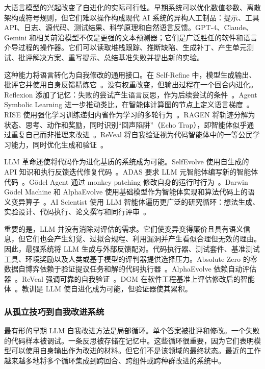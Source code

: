 大语言模型的兴起改变了自进化的实际可行性。早期系统可以优化数值参数、离散架构或符号规则，但它们难以操作构成现代 AI 系统的异构人工制品：提示、工具 API、日志、源代码、测试结果、科学原理和自然语言反馈。GPT-4、Claude、Gemini 和相关前沿模型不仅是更强的文本预测器；它们是广泛胜任的软件和语言介导过程的操作器。它们可以读取堆栈跟踪、推断缺陷、生成补丁、产生单元测试、批评解决方案、重写提示、总结基准失败并提出新的实验。

这种能力将语言转化为自我修改的通用接口。在 Self-Refine 中，模型生成输出、批评它并使用自身反馈精炼它~\citep{selfrefine2023}。没有权重改变，但输出过程在一个回合内进化。Reflexion 添加了记忆：失败的尝试产生语言反思，作为后续尝试的条件~\citep{reflexion2023}。Agent Symbolic Learning 进一步推动类比，在智能体计算图的节点上定义语言梯度~\citep{agentsymboliclearning2024}。RISE 使用强化学习训练递归内省作为学习的多轮行为~\citep{rise2024}。RAGEN 将轨迹分解为状态、思考、动作和奖励，同时识别``回声陷阱''（Echo Trap），即智能体似乎通过重复自己而非推理来改进~\citep{ragen2025}。ReVeal 将自我验证视为代码智能体中的一等公民学习能力，同时优化生成和验证~\citep{reveal2025}。

LLM 革命还使将代码作为进化基质的系统成为可能。SelfEvolve 使用自生成的 API 知识和执行反馈迭代修复代码~\citep{selfevolve2023}。ADAS 要求 LLM 元智能体编写新的智能体代码~\citep{adas2025}。G\"{o}del Agent 通过 monkey patching 修改自身的运行时行为~\citep{godelagent2024}。Darwin G\"{o}del Machine 和 AlphaEvolve 使用基础模型作为智能体实现和算法代码上的语义变异算子~\citep{darwingodelmachine2025,alphaevolve2025}。AI Scientist 使用 LLM 智能体遍历更广泛的研究循环：想法生成、实验设计、代码执行、论文撰写和同行评审~\citep{aiscientist2024}。

重要的是，LLM 并没有消除对评估的需求。它们使变异变得廉价且具有语义信息，但它们也会产生幻觉、过拟合规程、利用漏洞并产生看似合理但无效的理由。因此，最强系统将 LLM 生成与外部反馈配对。代码执行器、测试套件、基准测试工具、环境奖励以及人类或基于模型的评判器提供选择压力。Absolute Zero 的零数据自博弈依赖于验证提议任务和解的代码执行器~\citep{absolutezero2025}。AlphaEvolve 依赖自动评估器~\citep{alphaevolve2025}。ReVeal 强调可靠的自我验证~\citep{reveal2025}。DGM 在软件工程基准上评估修改后的智能体~\citep{darwingodelmachine2025}。教训是 LLM 使自进化成为可能，但验证器使其累积。

\subsubsection{从孤立技巧到自我改进系统}

最有形的早期 LLM 自我改进方法是局部循环。单个答案被批评和修改。一个失败的代码样本被调试。一条反思被存储在记忆中。这些循环很重要，因为它们表明模型可以使用自身输出作为改进的材料。但它们不是该领域的最终状态。最近的工作越来越多地将多个循环集成到跨回合、跨组件或跨种群改进的系统中。

